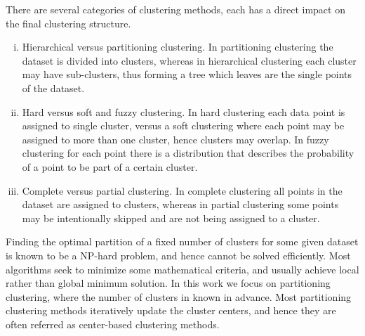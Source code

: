 \documentclass[12pt]{article}
\numberwithin{equation}{section}
\begin{document}
There are several categories of clustering methods, each has a direct impact on the final clustering structure.
\begin{enumerate}[(i)]
	\item Hierarchical versus partitioning clustering. In partitioning clustering the dataset is divided into clusters, whereas in hierarchical clustering each cluster may have sub-clusters, thus forming a tree which leaves are the single points of the dataset.
	\item Hard versus soft and fuzzy clustering. In hard clustering each data point is assigned to single cluster, versus a soft clustering where each point may be assigned to more than one cluster, hence clusters may overlap. In fuzzy clustering for each point there is a distribution that describes the probability of a point to be part of a certain cluster.
	\item Complete versus partial clustering. In complete clustering all points in the dataset are assigned to clusters, whereas in partial clustering some points may be intentionally skipped and are not being assigned to a cluster.
\end{enumerate}

Finding the optimal partition of a fixed number of clusters for some given dataset is known to be a NP-hard problem, and hence cannot be solved efficiently. Most algorithms seek to minimize some mathematical criteria, and usually achieve local rather than global minimum solution. In this work we focus on partitioning clustering, where the number of clusters in known in advance. Most partitioning clustering methods iteratively update the cluster centers, and hence they are often referred as center-based clustering methods.
\end{document}
